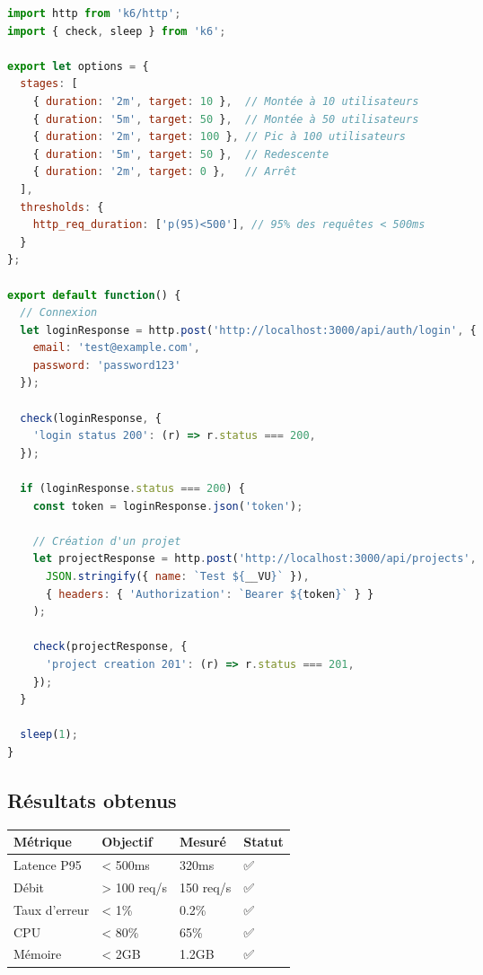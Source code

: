 \begin{lstlisting}[language=JavaScript]
import http from 'k6/http';
import { check, sleep } from 'k6';

export let options = {
  stages: [
    { duration: '2m', target: 10 },  // Montée à 10 utilisateurs
    { duration: '5m', target: 50 },  // Montée à 50 utilisateurs
    { duration: '2m', target: 100 }, // Pic à 100 utilisateurs
    { duration: '5m', target: 50 },  // Redescente
    { duration: '2m', target: 0 },   // Arrêt
  ],
  thresholds: {
    http_req_duration: ['p(95)<500'], // 95% des requêtes < 500ms
  }
};

export default function() {
  // Connexion
  let loginResponse = http.post('http://localhost:3000/api/auth/login', {
    email: 'test@example.com',
    password: 'password123'
  });

  check(loginResponse, {
    'login status 200': (r) => r.status === 200,
  });

  if (loginResponse.status === 200) {
    const token = loginResponse.json('token');

    // Création d'un projet
    let projectResponse = http.post('http://localhost:3000/api/projects',
      JSON.stringify({ name: `Test ${__VU}` }),
      { headers: { 'Authorization': `Bearer ${token}` } }
    );

    check(projectResponse, {
      'project creation 201': (r) => r.status === 201,
    });
  }

  sleep(1);
}
\end{lstlisting}

\subsection{Résultats obtenus}

\begin{center}
\begin{tabular}{|l|l|l|l|}
\hline
\textbf{Métrique} & \textbf{Objectif} & \textbf{Mesuré} & \textbf{Statut} \\
\hline
Latence P95 & < 500ms & 320ms & ✅ \\
Débit & > 100 req/s & 150 req/s & ✅ \\
Taux d'erreur & < 1\% & 0.2\% & ✅ \\
CPU & < 80\% & 65\% & ✅ \\
Mémoire & < 2GB & 1.2GB & ✅ \\
\hline
\end{tabular}
\end{center}

